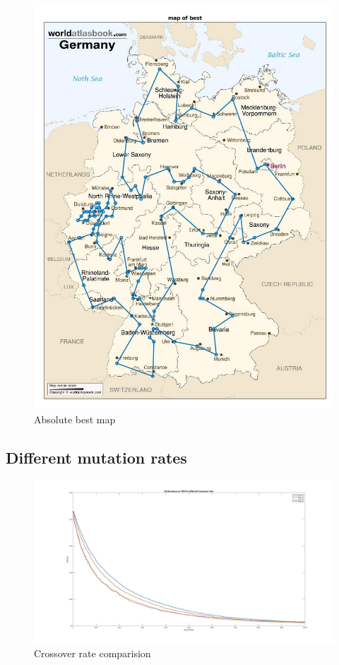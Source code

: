 \documentclass[a4paper, 12pt]{article}
\begin{document}
\begin{figure}[h!]
  \centering
  \includegraphics[width=1.0\textwidth]{images/BestPath.jpg}
    \caption{Absolute best map \label{fig:xxx1}}
\end{figure}

\newpage
\subsection{Different mutation rates}

\begin{figure}[ht!]
	\centering
	\includegraphics[width=1.0\textwidth]{images/crossover_exp_98.jpg}
	\caption{Crossover rate comparision\label{fig:crossfig}}
\end{figure}
\end{document}
